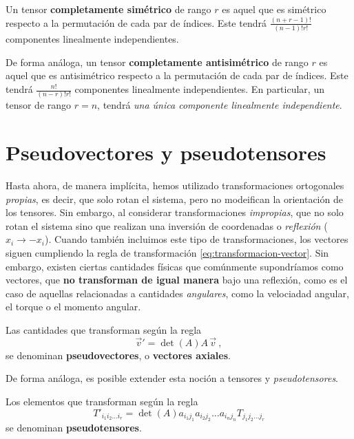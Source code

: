 \begin{itemize}
    Un tensor \textbf{completamente simétrico} de rango $r$ es aquel que es simétrico respecto a la permutación de cada par de índices. Este tendrá $\frac{(n+r-1)!}{(n-1)! r!}$ componentes linealmente independientes.

    De forma análoga, un tensor \textbf{completamente antisimétrico} de rango $r$ es aquel que es antisimétrico respecto a la permutación de cada par de índices. Este tendrá $\frac{n!}{(n-r)! r!}$ componentes linealmente independientes. En particular, un tensor de rango $r=n$, tendrá \emph{una única componente linealmente independiente}.
\end{itemize}

\section{Pseudovectores y pseudotensores}

Hasta ahora, de manera implícita, hemos utilizado transformaciones ortogonales \emph{propias}, es decir, que solo rotan el sistema, pero no modeifican la orientación de los tensores. Sin embargo, al considerar transformaciones \emph{impropias}, que no solo rotan el sistema sino que realizan una inversión de coordenadas o \emph{reflexión} ($x_i \to -x_i$). Cuando también incluimos este tipo de transformaciones, los vectores siguen cumpliendo la regla de transformación \eqref{eq:transformacion-vector}. Sin embargo, existen ciertas cantidades físicas que comúnmente supondríamos como vectores, que \textbf{no transforman de igual manera} bajo una reflexión, como es el caso de aquellas relacionadas a cantidades \emph{angulares}, como la velociadad angular, el torque o el momento angular.

\begin{defi} 
    Las cantidades que transforman según la regla
    \begin{equation} \label{eq:pseudovector}
        \vec{v}' = \det(A) A \, \vec{v} \ ,
    \end{equation}
    se denominan \textbf{pseudovectores}, o \textbf{vectores axiales}.
\end{defi}

De forma análoga, es posible extender esta noción a tensores y \emph{pseudotensores}.

\begin{defi} 
    Los elementos que transforman según la regla
    \begin{equation}
        T'_{i_1 i_2 \dots i_r} = \det(A) a_{i_1 j_1} a_{i_2 j_2} \dots a_{i_n j_n} T_{j_1 j_2 \dots j_r} 
    \end{equation}
    se denominan \textbf{pseudotensores}.
\end{defi}

